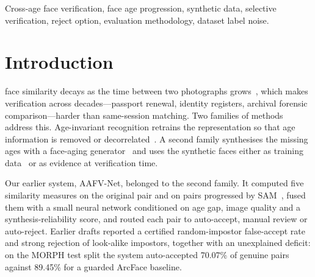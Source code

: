 \documentclass[journal]{IEEEtran}
\begin{document}
\begin{IEEEkeywords}
Cross-age face verification, face age progression, synthetic data, selective verification, reject option, evaluation methodology, dataset label noise.
\end{IEEEkeywords}

\section{Introduction}
 face similarity decays as the time between two photographs grows~\cite{bestrowden2018longitudinal}, which makes verification across decades---passport renewal, identity registers, archival forensic comparison---harder than same-session matching. Two families of methods address this. Age-invariant recognition retrains the representation so that age information is removed or decorrelated~\cite{wang2018oecnn,wang2019dal,huang2021mtlface,zhao2022aim,wang2025ordcon}. A second family synthesises the missing ages with a face-aging generator~\cite{tang2018ipcgan,huang2021pfagan,alaluf2021sam,chen2023fading} and uses the synthetic faces either as training data~\cite{huang2022mtlfacetpami,banerjee2023aging} or as evidence at verification time.

Our earlier system, AAFV-Net, belonged to the second family. It computed five similarity measures on the original pair and on pairs progressed by SAM~\cite{alaluf2021sam}, fused them with a small neural network conditioned on age gap, image quality and a synthesis-reliability score, and routed each pair to auto-accept, manual review or auto-reject. Earlier drafts reported a certified random-impostor false-accept rate and strong rejection of look-alike impostors, together with an unexplained deficit: on the MORPH test split the system auto-accepted 70.07\% of genuine pairs against 89.45\% for a guarded ArcFace baseline.
\end{document}
